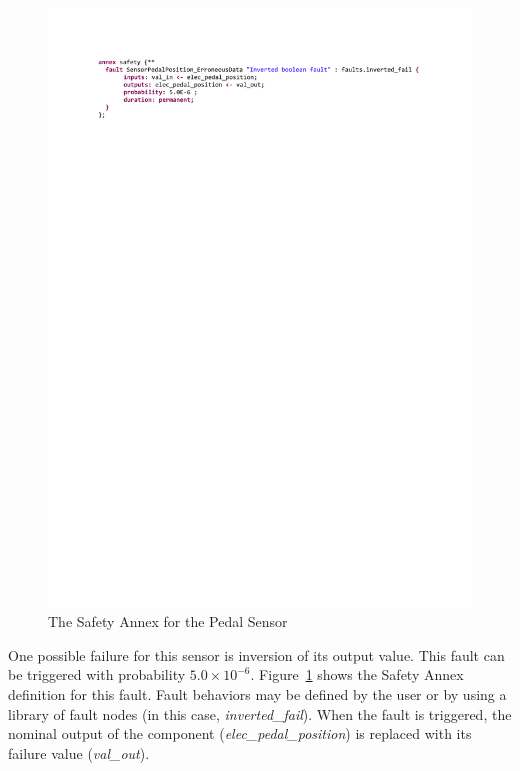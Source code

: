 \begin{figure}[h!]
	\hspace*{-2cm}
	\begin{center}
		\includegraphics[trim=0 690 -10 70,clip,width=1.5\dimexpr\textwidth-2cm\relax]{images/safetyannex_sensorfault.pdf}
		\caption{The Safety Annex for the Pedal Sensor}
		\label{fig:sensorFault}
	\end{center}
	\vspace{-0.3in}
\end{figure}

One possible failure for this sensor is inversion of its output value. This fault can be triggered with probability $5.0\times 10^{-6}$.  Figure~\ref{fig:sensorFault} shows the Safety Annex definition for this fault. Fault behaviors may be defined by the user or by using a library of fault nodes (in this case, \textit{inverted\_fail}).  When the fault is triggered, the nominal output of the component (\textit{elec\_pedal\_position}) is replaced with its failure value (\textit{val\_out}). 

